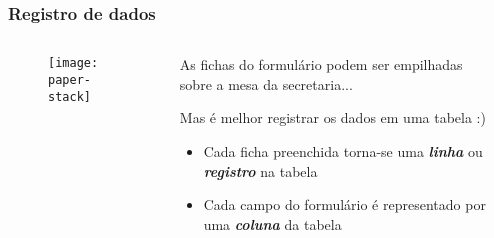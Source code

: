 \documentclass[t, 10pt, aspectratio=169, table, x11names]{beamer}
\begin{document}
	\begin{frame}
		\frametitle{Registro de dados}
		\begin{columns}[t]
			\begin{column}{0.40\textwidth}
				\begin{figure}[h]
					\texttt{[image: paper-stack]}
				\end{figure}
			\end{column}
			\begin{column}{0.55\textwidth}
				\vspace{2mm}
				
				As fichas do formulário podem ser empilhadas sobre a mesa da secretaria...
				
				\bigskip
				Mas é melhor registrar os dados em uma tabela :)
				\begin{itemize}
					\bigskip
					\item Cada ficha preenchida torna-se uma \textbf\textit{linha} ou \textbf{\textit{registro}} na tabela
					\item Cada campo do formulário é representado por uma \textbf{\textit{coluna}} da tabela
				\end{itemize}
			\end{column}
			\begin{column}{0.05\textwidth}
			\end{column}
		\end{columns}
	\end{frame}
\end{document}
